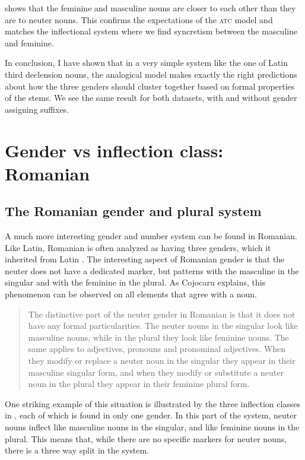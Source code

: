  shows that the feminine and masculine nouns are closer to each other than they are to neuter nouns. This confirms the expectations of the \textsc{atc} model and matches the inflectional system where we find syncretism between the masculine and feminine.

\largerpage 
In conclusion, I have shown that in a very simple system like the one of Latin third declension nouns, the analogical model makes exactly the right predictions about how the three genders should cluster together based on formal properties of the stems. We see the same result for both datasets, with and without gender assigning suffixes.


\section{Gender vs inflection class: Romanian}

\subsection{The Romanian gender and plural system}


A much more interesting gender and number system can be found in Romanian. Like Latin, Romanian is often analyzed as having three genders, which it inherited from Latin \autocite[23]{Gonczol.2007}. The interesting aspect of Romanian gender is that the neuter does not have a dedicated marker, but patterns with the masculine in the singular and with the feminine in the plural. As Cojocaru explains, this phenomenon can be observed on all elements that agree with a noun. 

\begin{quotation}
The distinctive part of the neuter gender in Romanian is that it does not have any formal particularities. The neuter nouns in the singular look like masculine nouns, while in the plural they look like feminine nouns. The same applies to adjectives, pronouns and pronominal adjectives. When they modify or replace a neuter noun in the singular they appear in their masculine singular form, and when they modify or substitute a neuter noun in the plural they appear in their feminine plural form. \autocite[27]{Cojocaru.2003}
\end{quotation}

One striking example of this situation is illustrated by the three inflection classes in , each of which is found in only one gender. In this part of the system, neuter nouns inflect like masculine nouns in the singular, and like feminine nouns in the plural. This means that, while there are no specific markers for neuter nouns, there is a three way split in the system.

